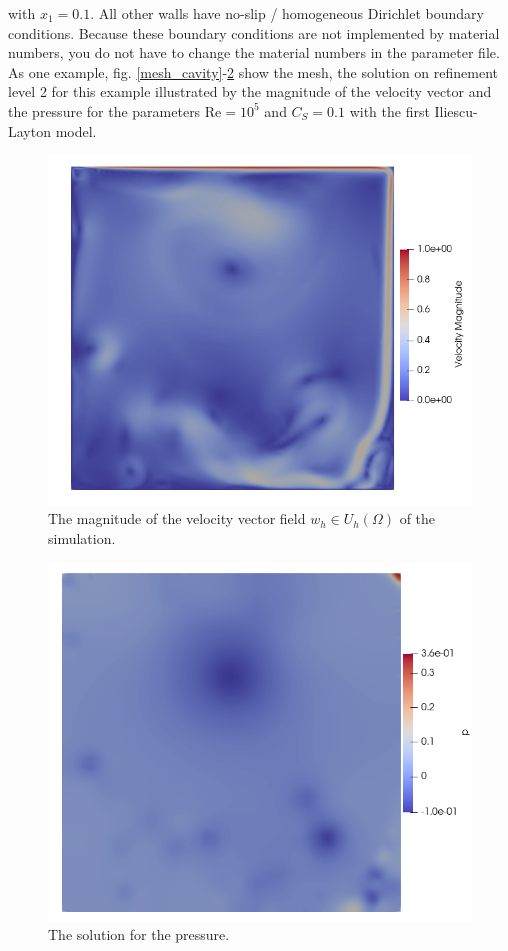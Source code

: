 \documentclass[a4paper, 11pt, twoside]{article}
\begin{document}
with $x_1 = 0.1$. All other walls have no-slip / homogeneous Dirichlet boundary conditions. Because these boundary conditions are not implemented by material numbers, you do not have to change the material numbers in the parameter file. As one example, fig. \ref{mesh_cavity}-\ref{pressure_cavity} show the mesh, the solution on refinement level 2 for this example illustrated by the magnitude of the velocity vector and the
pressure for the parameters $\text{Re} = 10^5$ and $C_S = 0.1$ with the first Iliescu-Layton model.  

\begin{figure}[!ht]
	\centering
	\includegraphics[scale=0.35]{./fig/vili.png}
\caption{The magnitude of the velocity vector field $w_h \in U_h(\Omega)$ of the simulation.}
\label{sol_cavity}
\end{figure}

\begin{figure}[!ht]
	\centering
	\includegraphics[scale = 0.35]{./fig/pili.png}
\caption{The solution for the pressure.}
\label{pressure_cavity}
\end{figure}

\newpage
\appendix



\printindex
\end{document}
